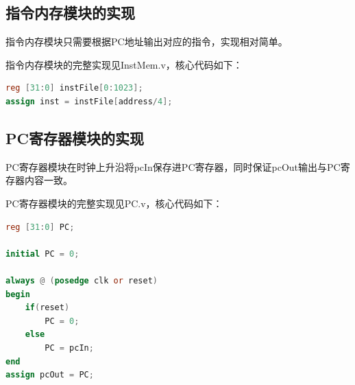 \documentclass[UTF8]{ctexart}
\begin{document}
\subsection{指令内存模块的实现}
    指令内存模块只需要根据PC地址输出对应的指令，实现相对简单。\par
    指令内存模块的完整实现见InstMem.v，核心代码如下：
\begin{lstlisting}[language=verilog]
reg [31:0] instFile[0:1023];
assign inst = instFile[address/4];
\end{lstlisting}

\subsection{PC寄存器模块的实现}
    PC寄存器模块在时钟上升沿将pcIn保存进PC寄存器，同时保证pcOut输出与PC寄存器内容一致。\par
    PC寄存器模块的完整实现见PC.v，核心代码如下：
\begin{lstlisting}[language=verilog]
reg [31:0] PC;

initial PC = 0;

always @ (posedge clk or reset)
begin
    if(reset)
        PC = 0;
    else
        PC = pcIn;
end
assign pcOut = PC;
\end{lstlisting}
\end{document}
